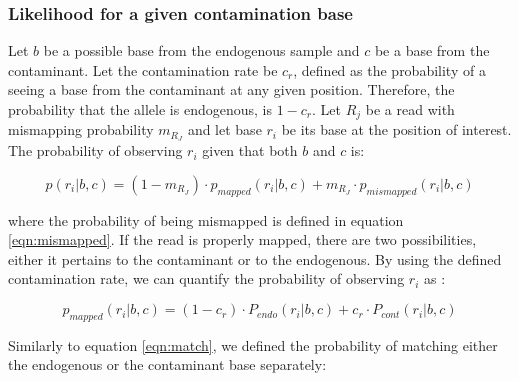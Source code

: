 \documentclass[a4paper,12pt]{article}
\begin{document}

\subsubsection{Likelihood for a given contamination base}

Let $b$ be a possible base from the endogenous sample and $c$ be a base from the contaminant. Let the contamination rate be $c_r$, defined as the probability of a seeing a base from the contaminant at any given position. Therefore, the probability that the allele is endogenous, is $1-c_r$. Let $R_j$ be a read with mismapping probability $m_{R_J}$ and let base $r_i$ be its base at the position of interest. The probability of observing $r_i$ given that both $b$ and $c$ is:

\begin{equation}
p(r_i|b,c)  = (1-m_{R_J}) \cdot p_{mapped}(r_i|b,c) + m_{R_J} \cdot p_{mismapped}(r_i|b,c)  
\label{eqn:singlereadcont}
\end{equation}

\noindent where the probability of being mismapped is defined in equation \ref{eqn:mismapped}. If the read is properly mapped, there are two possibilities, either it pertains to the contaminant or to the endogenous. By using the defined contamination rate, we can quantify the probability of observing $r_i$ as :

\begin{equation}
p_{mapped}(r_i|b,c) = (1-c_r) \cdot P_{endo} (r_i|b,c)   + c_r \cdot P_{cont} (r_i|b,c)
\end{equation}

\noindent Similarly to equation \ref{eqn:match}, we defined the probability of matching either the endogenous or the contaminant base separately:
\end{document}
